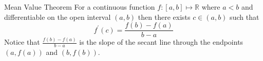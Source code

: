 \documentclass{standalone}
\begin{document}
\begin{theo*}{Mean Value Theorem}
  For a continuous function $f: \left[ a,b \right] \mapsto \mathbb{R} $ where $a < b$ and differentiable on the open interval $ \left( a, b \right)$ then there exists $c \in \left( a, b \right)$ such that 
  \[
  f ^{\prime}\left(c\right) = \frac{f\left(b\right)  -  f\left(a\right)}{b  -  a}
  \]
  Notice that  $ \frac{f\left(b\right)  -  f\left(a\right)}{b  -  a}$ is the slope of the secant line through the endpoints $ \left(  a, f\left(a\right) \right)$ and $ \left( b, f\left(b\right) \right)$.
\end{theo*}
\end{document}
